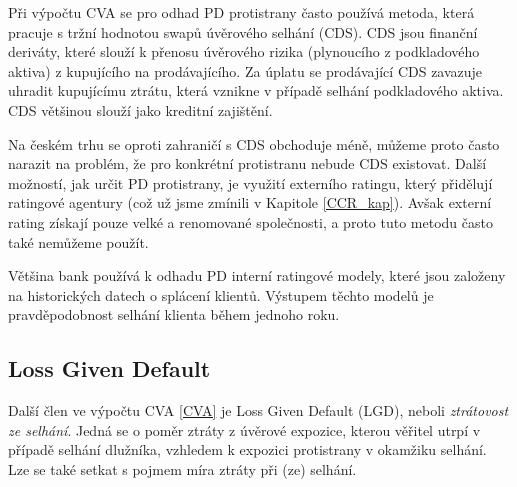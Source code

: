 \documentclass[a4paper,12pt]{report}
\theoremstyle{definition} \newtheorem{definice}[veta]{Definice}
\theoremstyle{remark}
\begin{document}
Při výpočtu CVA se pro odhad PD protistrany často používá metoda, která pracuje s tržní hodnotou swapů úvěrového selhání (CDS).
CDS jsou finanční deriváty, které slouží k přenosu úvěrového rizika (plynoucího z podkladového aktiva) z kupujícího na prodávajícího.
Za úplatu se prodávající CDS zavazuje uhradit kupujícímu ztrátu, která vznikne v případě selhání podkladového aktiva.
CDS většinou slouží jako kreditní zajištění.

Na českém trhu se oproti zahraničí s CDS obchoduje méně, můžeme proto často narazit na problém, že pro konkrétní protistranu nebude CDS existovat.
Další možností, jak určit PD protistrany, je využití externího ratingu, který přidělují ratingové agentury (což už jsme zmínili v Kapitole \ref{CCR_kap}).
Avšak externí rating získají pouze velké a renomované společnosti, a proto tuto metodu často také nemůžeme použít.

Většina bank používá k odhadu PD interní ratingové modely, které jsou založeny na historických datech o splácení klientů.
Výstupem těchto modelů je pravděpodobnost selhání klienta během jednoho roku.
 




\subsection{Loss Given Default}
Další člen ve výpočtu CVA \eqref{CVA} je Loss Given Default (LGD), neboli \textit{ztrátovost ze selhání}.
Jedná se o poměr ztráty z úvěrové expozice, kterou věřitel utrpí v případě selhání dlužníka, vzhledem k expozici protistrany v okamžiku selhání. 
Lze se také setkat s pojmem míra ztráty při (ze) selhání.
\end{document}
